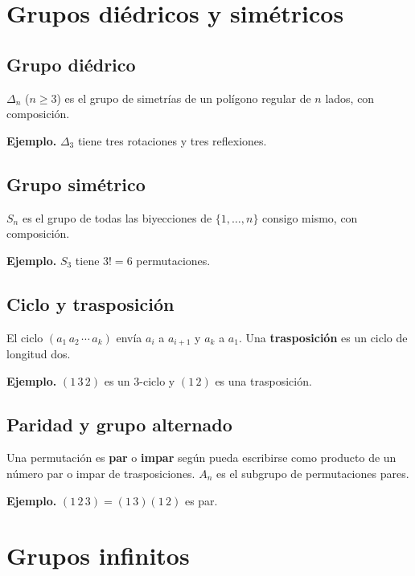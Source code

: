 \documentclass[11pt,a4paper]{article}
\begin{document}
\section{Grupos diédricos y simétricos}

\subsection{Grupo diédrico}
\begin{definicion}
$\Delta_n$ ($n\ge3$) es el grupo de simetrías de un polígono regular de $n$ lados, con composición.
\end{definicion}
\textbf{Ejemplo.} $\Delta_3$ tiene tres rotaciones y tres reflexiones.


\subsection{Grupo simétrico}
\begin{definicion}
$S_n$ es el grupo de todas las biyecciones de $\{1,\ldots,n\}$ consigo mismo, con composición.
\end{definicion}
\textbf{Ejemplo.} $S_3$ tiene $3!=6$ permutaciones.


\subsection{Ciclo y trasposición}
\begin{definicion}
El ciclo $(a_1\,a_2\,\cdots\,a_k)$ envía $a_i$ a $a_{i+1}$ y $a_k$ a $a_1$. Una \textbf{trasposición} es un ciclo de longitud dos.
\end{definicion}
\textbf{Ejemplo.} $(1\,3\,2)$ es un $3$-ciclo y $(1\,2)$ es una trasposición.


\subsection{Paridad y grupo alternado}
\begin{definicion}
Una permutación es \textbf{par} o \textbf{impar} según pueda escribirse como producto de un número par o impar de trasposiciones. $A_n$ es el subgrupo de permutaciones pares.
\end{definicion}
\textbf{Ejemplo.} $(1\,2\,3)=(1\,3)(1\,2)$ es par.


\section{Grupos infinitos}
\end{document}
